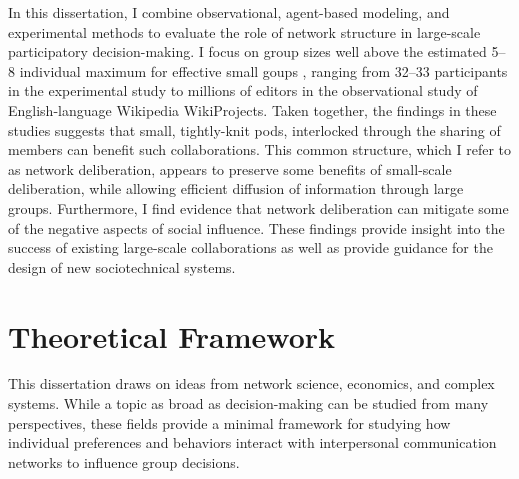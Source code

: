 In this dissertation, I combine observational, agent-based modeling, and experimental
methods to evaluate the role of network structure in large-scale participatory decision-making.
I focus on group sizes well above the estimated 5--8 individual maximum for effective small goups
\cite{freeman_tyranny_1972, lohman_designing_2000, miflin_small_2004},
ranging from 32--33 participants in the experimental study to millions of editors in the
observational study of English-language Wikipedia WikiProjects.
Taken together, the findings in these studies suggests that small, tightly-knit pods,
interlocked through the sharing of members can benefit such collaborations.
This common structure, which I refer to as network deliberation, appears to preserve some
benefits of small-scale deliberation, while allowing efficient diffusion of information
through large groups.
Furthermore, I find evidence that network deliberation can mitigate some of the negative
aspects of social influence.
These findings provide insight into the success of existing large-scale collaborations
as well as provide guidance for the design of new sociotechnical systems.


\section{Theoretical Framework}

This dissertation draws on ideas from network science, economics, and complex
systems.
While a topic as broad as decision-making can be studied from many perspectives,
these fields provide a minimal framework for studying how individual preferences
and behaviors interact with interpersonal communication networks to influence
group decisions.

